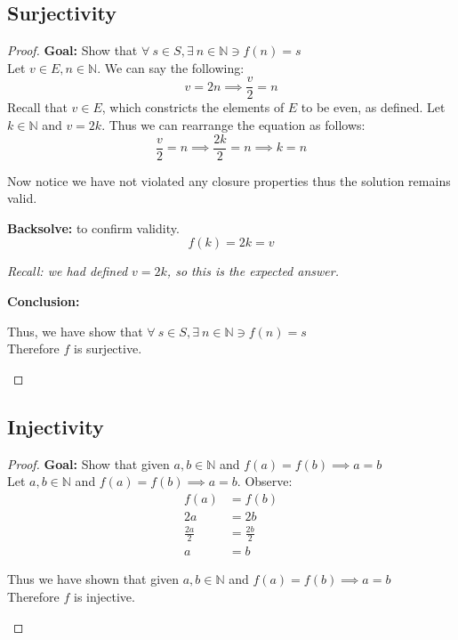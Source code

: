 \documentclass[11pt]{article}
\theoremstyle{plain}
\begin{document}
\subsection*{Surjectivity}
\begin{proof} \textbf{Goal:} Show that $\forall ~s \in S, \exists ~n \in \mathbb{N} \ni f(n) = s$ \\
	Let $v \in E, n \in \mathbb{N}$. We can say the following:
	\[
		v = 2n \implies \frac{v}{2} = n
	\]
	Recall that $v \in E$, which constricts the elements of $E$ to be even, as defined.
	Let $k \in \mathbb{N}$ and $v = 2k$. Thus we can rearrange the equation as follows:
	\[
		\frac{v}{2} = n \implies \frac{2k}{2} = n \implies k = n
	\]
	\begin{center} Now notice we have not violated any closure properties thus the solution remains valid. \end{center}
	\textbf{Backsolve:} to confirm validity.
	\[
		f(k) = 2k = v
	\]
	\begin{center} \textit{Recall: we had defined $v = 2k$, so this is the expected answer.}\\ \end{center}
	\textbf{Conclusion:}
	\begin{center}
		Thus, we have show that $\forall ~s \in S, \exists ~n \in \mathbb{N} \ni f(n) = s$ \\
		Therefore $f$ is surjective.
	\end{center}
\end{proof}
\subsection*{Injectivity}
\begin{proof} \textbf{Goal:} Show that given $a,b \in \mathbb{N}$ and $f(a) = f(b) \implies a = b$ \\
	Let $a,b \in \mathbb{N}$ and $f(a) = f(b) \implies a = b$. Observe:
	\begin{align*}
		f(a)         & = f(b)         \\
		2a           & = 2b           \\
		\frac{2a}{2} & = \frac{2b}{2} \\
		a            & = b
	\end{align*}
	\begin{center}
		Thus we have shown that given $a,b \in \mathbb{N}$ and $f(a) = f(b) \implies a = b$ \\
		Therefore $f$ is injective.
	\end{center}
\end{proof}
\end{document}
